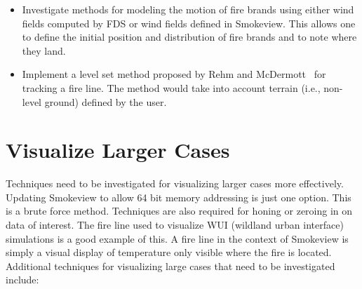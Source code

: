 \documentclass[11pt,twoside]{book}
\begin{document}
\begin{itemize}
\item  Investigate methods for modeling the motion of fire brands
using either wind fields computed by FDS or wind fields defined in
Smokeview. This allows one to define the initial position and
distribution of fire brands and to note where they land.

\item Implement a level set method proposed by Rehm and
McDermott~\cite{Rehm:LevelSet} for tracking a fire line.  The
method would take into account terrain (i.e., non-level
ground) defined by the user.
\end{itemize}

%
%

\section{Visualize Larger Cases}
Techniques need to be investigated for visualizing larger cases
more effectively.  Updating Smokeview to allow 64 bit memory
addressing is just one option.  This is a brute force method.
Techniques are also required for honing or zeroing in on data of
interest.  The fire line used to visualize WUI (wildland urban
interface) simulations is a good example of this.  A fire line in
the context of Smokeview is simply a visual display of temperature
only visible where the fire is located.  Additional techniques for
visualizing large cases that need to be investigated include:
\end{document}
